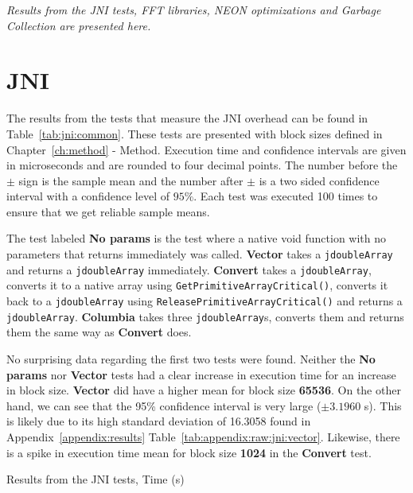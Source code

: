 \textit{Results from the JNI tests, FFT libraries, NEON optimizations and Garbage Collection are presented here.}

\section{JNI}
The results from the tests that measure the JNI overhead can be found in Table~\ref{tab:jni:common}. These tests are presented with block sizes defined in Chapter~\ref{ch:method} - Method. Execution time and confidence intervals are given in microseconds and are rounded to four decimal points. The number before the $\pm$ sign is the sample mean and the number after $\pm$ is a two sided confidence interval with a confidence level of $95\%$. Each test was executed 100 times to ensure that we get reliable sample means.

The test labeled \textbf{No params} is the test where a native void function with no parameters that returns immediately was called. \textbf{Vector} takes a \texttt{jdoubleArray} and returns a \texttt{jdoubleArray} immediately. \textbf{Convert} takes a \texttt{jdoubleArray}, converts it to a native array using \texttt{GetPrimitiveArrayCritical()}, converts it back to a \texttt{jdoubleArray} using \texttt{ReleasePrimitiveArrayCritical()} and returns a \texttt{jdoubleArray}. \textbf{Columbia} takes three \texttt{jdoubleArray}s, converts them and returns them the same way as \textbf{Convert} does.

No surprising data regarding the first two tests were found. Neither the \textbf{No params} nor \textbf{Vector} tests had a clear increase in execution time for an increase in block size. \textbf{Vector} did have a higher mean for block size \textbf{65536}. On the other hand, we can see that the 95\% confidence interval is very large ($\pm 3.1960$ \textmu s). This is likely due to its high standard deviation of 16.3058 found in Appendix~\ref{appendix:results} Table~\ref{tab:appendix:raw:jni:vector}. Likewise, there is a spike in execution time mean for block size \textbf{1024} in the \textbf{Convert} test.

\ifrelease
\begin{table}[H]
    \centering
    \caption{Results from the JNI tests, Time (\textmu s)}
    \label{tab:jni:common}
    
\end{table}
\fi


